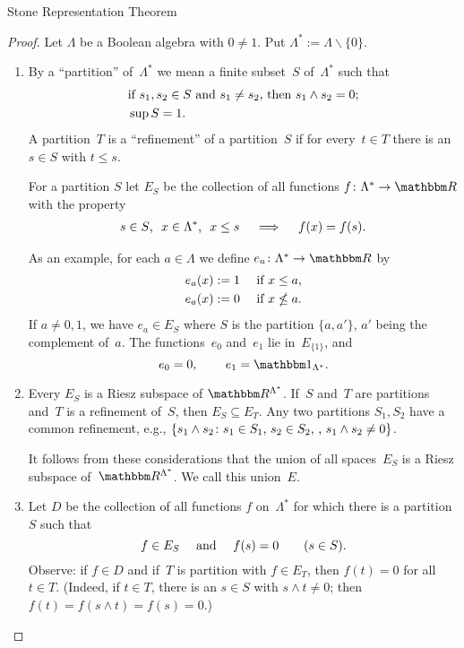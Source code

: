 \documentclass[main.tex]{subfiles}
\begin{document}
%
%
\begin{psec}{3.20}{Stone Representation Theorem}
\end{psec}
\begin{proof}
Let $\Lambda$ be a Boolean algebra with $0\neq 1$.
Put $\Lambda^*:=\Lambda \backslash\{0\}$.
\begin{enumerate}[label=(\Roman*),leftmargin=*]
\item \label{3.20-I}
By a ``partition'' of~$\Lambda^*$
we mean a finite subset~$S$ of~$\Lambda^*$
such that
\begin{alignat*}{2}
& \htam{if }s_1,s_2\in S\htam{ and }s_1\neq s_2
   \htam{, then }s_1\wedge s_2=0\htam{;} \\
& \sup S=1\htam{.}
\end{alignat*}
A partition~$T$ is a ``refinement'' of a partition~$S$
if for every~$t\in T$ there is an~$s\in S$ with $t\leq s$.

For a partition $S$ let $E_S$ be the collection
of all functions $f\colon \Lambda^* \ra \R$ with the property
\begin{align*}
s\in S\text{, }\ x\in\Lambda^*\text{, }\ x\leq s
\quad \implies \quad f(x)=f(s)\text{.}
\end{align*}

As an example,
for each $a\in\Lambda$ 
we define $e_a\colon \Lambda^* \ra \R$ by
\begin{alignat*}{2}
e_a(x) := 1 \quad & \htam{ if } x\leq a\htam{,} \\
e_a(x) := 0 \quad & \htam{ if } x\nleq a\htam{.}
\end{alignat*}
If $a\neq0,1$, we have $e_a\in E_S$ 
where $S$ is the partition $\{a, a'\}$,
$a'$ being the complement of~$a$.
The functions~$e_0$ and~$e_1$ lie in~$E_{\{1\}}$,
and
\begin{equation*}
e_0 = 0\htam{, } \qquad e_1 = \mathbb{1}_{\Lambda^*}\htam{.}
\end{equation*}
%
\item \label{3.20-II}
Every $E_S$ is a Riesz subspace of $\R^{\Lambda^*}$.
If~$S$ and~$T$ are partitions
and~$T$ is a refinement of~$S$,
then $E_S\subseteq E_T$.
Any two partitions $S_1,S_2$ 
have a common refinement,
e.g., $\{ s_1 \wedge s_2\colon s_1\in S_1\text{, }s_2\in S_2\text{, }\text{, }
  s_1 \wedge s_2 \neq 0\}$.

It follows from these considerations 
that the union of all spaces~$E_S$
is a Riesz subspace of~$\R^{\Lambda^*}$.
We call this union~$E$.
%
\item \label{3.20-III}
Let $D$ be the collection of all functions $f$ on~$\Lambda^*$
for which there is a partition~$S$ such that
\begin{equation*}
f\in E_S \quad \text{ and } \quad f(s)=0 \qquad (s\in S)\text{.}
\end{equation*}
Observe: if $f\in D$ 
and if~$T$ is  
partition with $f\in E_T$,
then $f(t)=0$ for all $t\in T$.
(Indeed, if $t\in T$,
there is an $s\in S$ with $s\wedge t\neq 0$;
then $f(t)=f(s\wedge t)=f(s)=0$.)


\end{enumerate}
\end{proof}
\end{document}
